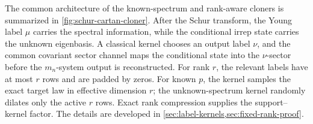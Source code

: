 \documentclass[11pt]{article}
\theoremstyle{remark}
\theoremstyle{plain}
\begin{document}
The common architecture of the known-spectrum and rank-aware cloners is
summarized in \cref{fig:schur-cartan-cloner}.  After the Schur transform, the
Young label \(\mu\) carries the spectral information, while the conditional
irrep state carries the unknown eigenbasis.  A classical kernel chooses an
output label \(\nu\), and the common covariant sector channel maps the conditional
state into the \(\nu\)-sector before the \(m_n\)-system output is reconstructed.
For rank \(r\), the relevant labels have at most \(r\) rows and are padded by
zeros.  For known \(p\), the kernel samples the exact target law in effective
dimension \(r\); the unknown-spectrum kernel randomly dilates only the
active \(r\) rows.  Exact rank compression supplies the support--kernel
factor.  The details are developed in
\cref{sec:label-kernels,sec:fixed-rank-proof}.
\end{document}
